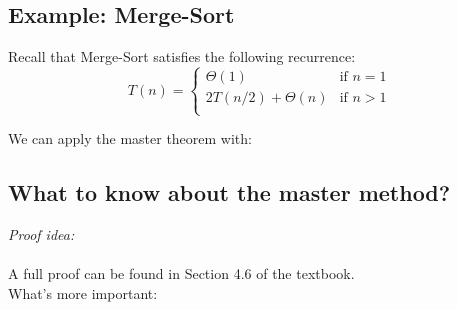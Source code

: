 \documentclass[11  pt]{article}
\begin{document}
\subsection{Example: Merge-Sort}

Recall that Merge-Sort satisfies the following recurrence:
\begin{equation}
	T(n) = \begin{cases}
		\Theta(1) & \text{if $n = 1$} \\
		2T(n/2) + \Theta(n) & \text{if $n > 1$} \\
	\end{cases}
\end{equation}

We can apply the master theorem with:\\

\vs{2cm} 

%

\subsection{What to know about the master method?}

\emph{Proof idea:} \\ \\%

A full proof can be found in Section 4.6 of the textbook. \\


What's more important:  %
\end{document}
